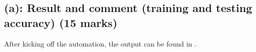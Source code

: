 \documentclass{tron}
\begin{document}
%	
%		
%	
%	
%		
%		
%		
%		
%	
%	
%		
%		
%		
%		
%		
%		
%		
%		
%		


\subsection{(a): Result and comment (training and testing accuracy) (15 marks)}
After kicking off the automation, the output can be found in . 
\end{document}
